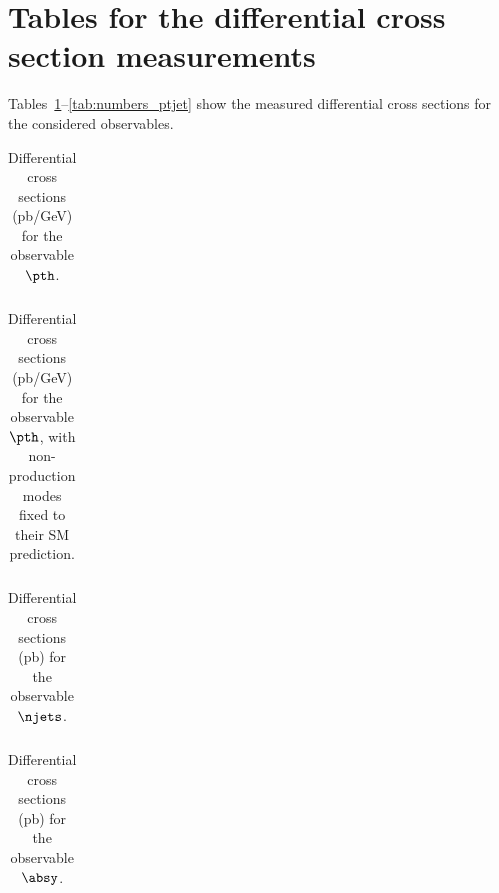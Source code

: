 \section{Tables for the differential cross section measurements}
\label{sec:tables}

Tables~\ref{tab:numbers_pth_smH}--\ref{tab:numbers_ptjet} show the measured differential cross sections for the considered observables.

\begin{table}[h!]
    \caption{
        Differential cross sections (pb/GeV) for the observable $\pth$.
        }
    \label{tab:numbers_pth_smH}
    \scriptsize
    \begin{center}
    \begin{tabular}{|l|c|c|c|c|c|c|c|c|c|}
    \hline
     \\
    \hline
    \end{tabular}
    \end{center}
    \end{table}

\begin{table}[h!]
    \caption{
        Differential cross sections (pb/GeV) for the observable $\pth$, with non-\ggh production modes fixed to their SM prediction.
        }
    \label{tab:numbers_pth_ggH}
    \scriptsize
    \begin{center}
    \begin{tabular}{|l|c|c|c|c|c|c|c|c|c|}
    \hline
     \\
    \hline
    \end{tabular}
    \end{center}
    \end{table}


\begin{table}[h!]
    \caption{
        Differential cross sections (pb) for the observable $\njets$.
        }
    \label{tab:numbers_njets}
    \scriptsize
    \begin{center}
    \begin{tabular}{|l|c|c|c|c|c|}
    \hline
     \\
    \hline
    \end{tabular}
    \end{center}
    \end{table}

\begin{table}[h!]
    \caption{
        Differential cross sections (pb) for the observable $\absy$.
        }
    \label{tab:numbers_absy}
    \scriptsize
    \begin{center}
    \begin{tabular}{|l|c|c|c|c|c|c|}
    \hline
     \\
    \hline
    \end{tabular}
    \end{center}
    \end{table}

